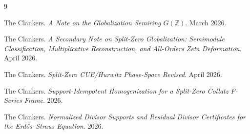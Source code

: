 \documentclass[11pt]{article}
\begin{document}
\begin{thebibliography}{9}

The Clankers.
\emph{A Note on the Globalization Semiring \(G(\mathbb Z)\)}.
March 2026.

The Clankers.
\emph{A Secondary Note on Split-Zero Globalization: Semimodule Classification, Multiplicative Reconstruction, and All-Orders Zeta Deformation}.
April 2026.

The Clankers.
\emph{Split-Zero CUE/Hurwitz Phase-Space Revised}.
April 2026.

The Clankers.
\emph{Support-Idempotent Homogenization for a Split-Zero Collatz F-Series Frame}.
2026.

The Clankers.
\emph{Normalized Divisor Supports and Residual Divisor Certificates for the Erdős--Straus Equation}.
2026.

\end{thebibliography}
\end{document}
